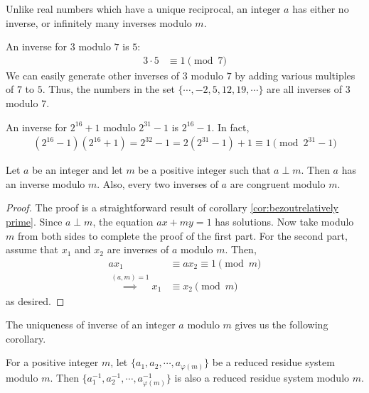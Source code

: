 \begin{note}
	Unlike real numbers which have a unique reciprocal, an integer $a$ has either no inverse, or infinitely many inverses modulo $m$.
\end{note}

\begin{example}
	An inverse for $3$ modulo $7$ is $5$:
		\begin{align*}
			3 \cdot 5
				& \equiv 1 \pmod 7
		\end{align*}
	We can easily generate other inverses of $3$ modulo $7$ by adding various multiples of $7$ to $5$. Thus, the numbers in the set $\{\cdots, -2, 5, 12, 19, \cdots \}$ are all inverses of $3$ modulo $7$.
\end{example}

\begin{example}
	An inverse for $2^{16}+1$ modulo $2^{31}-1$ is $2^{16}-1$. In fact,
		\begin{align*}
			(2^{16} - 1)(2^{16} + 1) = 2^{32} -1 = 2(2^{31} - 1) + 1 \equiv 1 \pmod{2^{31} - 1}
		\end{align*}
\end{example}


\begin{theorem} \label{thm:arithinverse}
	Let $a$ be an integer and let $m$ be a positive integer such that $a \perp m$. Then $a$ has an inverse modulo $m$. Also, every two inverses of $a$ are congruent modulo $m$.
\end{theorem}

\begin{proof}
	The proof is a straightforward result of corollary \eqref{cor:bezoutrelatively prime}. Since $a \perp m$, the equation $ax+my=1$ has solutions. Now take modulo $m$ from both sides to complete the proof of the first part. For the second part, assume that $x_1$ and $x_2$ are inverses of $a$ modulo $m$. Then,
	\begin{align*}
	ax_1
		& \equiv ax_2 \equiv 1 \pmod m\\
	\stackrel{(a,m)=1}{\implies} x_1
		& \equiv x_2 \pmod m
	\end{align*}
	as desired.
\end{proof}

The uniqueness of inverse of an integer $a$ modulo $m$ gives us the following corollary.

\begin{corollary}
	For a positive integer $m$, let $\{a_{1}, a_{2}, \cdots, a_{\varphi(m)}\}$ be a reduced residue system modulo $m$. Then $\{a_{1}^{-1}, a_{2}^{-1}, \cdots, a_{\varphi(m)}^{-1}\}$ is also a reduced residue system modulo $m$.
\end{corollary}


